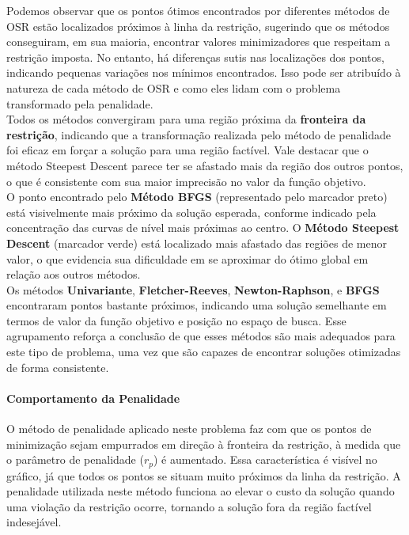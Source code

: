 \documentclass[a4paper, 12pt]{article}
\begin{document}
Podemos observar que os pontos ótimos encontrados por diferentes métodos de OSR estão localizados próximos à linha da restrição, sugerindo que os métodos conseguiram, em sua maioria, encontrar valores minimizadores que respeitam a restrição imposta. No entanto, há diferenças sutis nas localizações dos pontos, indicando pequenas variações nos mínimos encontrados. Isso pode ser atribuído à natureza de cada método de OSR e como eles lidam com o problema transformado pela penalidade.\\

Todos os métodos convergiram para uma região próxima da \textbf{fronteira da restrição}, indicando que a transformação realizada pelo método de penalidade foi eficaz em forçar a solução para uma região factível. Vale destacar que o método Steepest Descent parece ter se afastado mais da região dos outros pontos, o que é consistente com sua maior imprecisão no valor da função objetivo.\\

O ponto encontrado pelo \textbf{Método BFGS} (representado pelo marcador preto) está visivelmente mais próximo da solução esperada, conforme indicado pela concentração das curvas de nível mais próximas ao centro. O \textbf{Método Steepest Descent} (marcador verde) está localizado mais afastado das regiões de menor valor, o que evidencia sua dificuldade em se aproximar do ótimo global em relação aos outros métodos.\\

Os métodos \textbf{Univariante}, \textbf{Fletcher-Reeves}, \textbf{Newton-Raphson}, e \textbf{BFGS} encontraram pontos bastante próximos, indicando uma solução semelhante em termos de valor da função objetivo e posição no espaço de busca. Esse agrupamento reforça a conclusão de que esses métodos são mais adequados para este tipo de problema, uma vez que são capazes de encontrar soluções otimizadas de forma consistente.

\paragraph{Comportamento da Penalidade}

O método de penalidade aplicado neste problema faz com que os pontos de minimização sejam empurrados em direção à fronteira da restrição, à medida que o parâmetro de penalidade (\( r_p \)) é aumentado. Essa característica é visível no gráfico, já que todos os pontos se situam muito próximos da linha da restrição. A penalidade utilizada neste método funciona ao elevar o custo da solução quando uma violação da restrição ocorre, tornando a solução fora da região factível indesejável.
\end{document}
